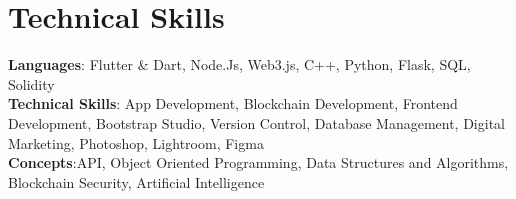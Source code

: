 \section{Technical Skills}
\begin{itemize}[leftmargin=0.15in, label={}]
\small{\item{
\textbf{Languages}{: Flutter \& Dart, Node.Js, Web3.js, C++, Python, Flask, SQL, Solidity} \\
\textbf{Technical Skills}{: App Development, Blockchain Development, Frontend Development, Bootstrap Studio, Version Control, Database Management, Digital Marketing, Photoshop, Lightroom, Figma} \\ 
\textbf{Concepts}{:API, Object Oriented Programming, Data Structures and Algorithms, Blockchain Security, Artificial Intelligence}
}}
\end{itemize}